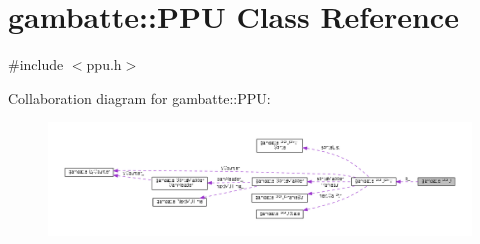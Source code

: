\hypertarget{classgambatte_1_1PPU}{}\section{gambatte\+:\+:P\+PU Class Reference}
\label{classgambatte_1_1PPU}


{\ttfamily \#include $<$ppu.\+h$>$}



Collaboration diagram for gambatte\+:\+:P\+PU\+:
\nopagebreak
\begin{figure}[H]
\begin{center}
\leavevmode
\includegraphics[width=350pt]{classgambatte_1_1PPU__coll__graph}
\end{center}
\end{figure}
